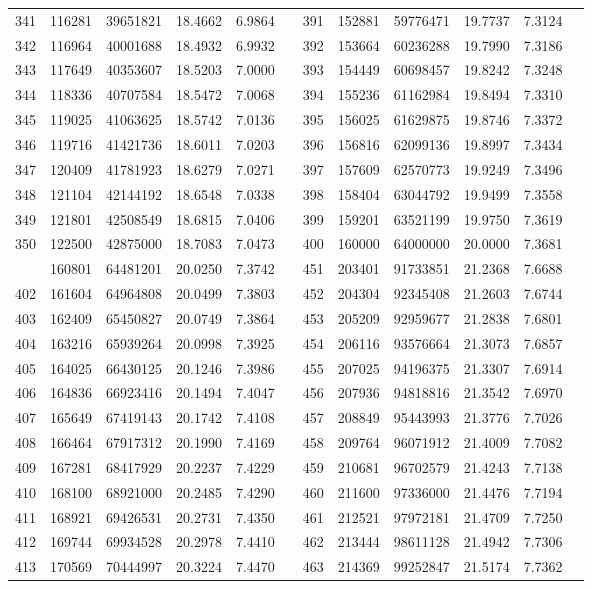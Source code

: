 \begin{longtable}{SSSSSSSSSSSS}
341&116281&39651821&18.4662&6.9864&&391&152881&59776471&19.7737&7.3124\\
342&116964&40001688&18.4932&6.9932&&392&153664&60236288&19.7990&7.3186\\
343&117649&40353607&18.5203&7.0000&&393&154449&60698457&19.8242&7.3248\\
344&118336&40707584&18.5472&7.0068&&394&155236&61162984&19.8494&7.3310\\
345&119025&41063625&18.5742&7.0136&&395&156025&61629875&19.8746&7.3372\\
346&119716&41421736&18.6011&7.0203&&396&156816&62099136&19.8997&7.3434\\
347&120409&41781923&18.6279&7.0271&&397&157609&62570773&19.9249&7.3496\\
348&121104&42144192&18.6548&7.0338&&398&158404&63044792&19.9499&7.3558\\
349&121801&42508549&18.6815&7.0406&&399&159201&63521199&19.9750&7.3619\\
350&122500&42875000&18.7083&7.0473&&400&160000&64000000&20.0000&7.3681\\
&160801&64481201&20.0250&7.3742&&451&203401&91733851&21.2368&7.6688\\
402&161604&64964808&20.0499&7.3803&&452&204304&92345408&21.2603&7.6744\\
403&162409&65450827&20.0749&7.3864&&453&205209&92959677&21.2838&7.6801\\
404&163216&65939264&20.0998&7.3925&&454&206116&93576664&21.3073&7.6857\\
405&164025&66430125&20.1246&7.3986&&455&207025&94196375&21.3307&7.6914\\
406&164836&66923416&20.1494&7.4047&&456&207936&94818816&21.3542&7.6970\\
407&165649&67419143&20.1742&7.4108&&457&208849&95443993&21.3776&7.7026\\
408&166464&67917312&20.1990&7.4169&&458&209764&96071912&21.4009&7.7082\\
409&167281&68417929&20.2237&7.4229&&459&210681&96702579&21.4243&7.7138\\
410&168100&68921000&20.2485&7.4290&&460&211600&97336000&21.4476&7.7194\\
411&168921&69426531&20.2731&7.4350&&461&212521&97972181&21.4709&7.7250\\
412&169744&69934528&20.2978&7.4410&&462&213444&98611128&21.4942&7.7306\\
413&170569&70444997&20.3224&7.4470&&463&214369&99252847&21.5174&7.7362\\

\end{longtable}
